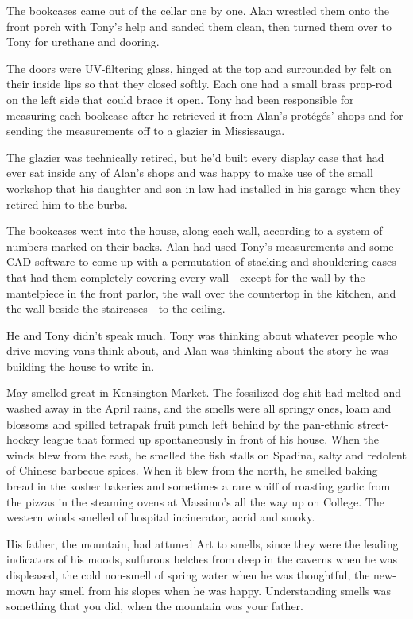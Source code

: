 \documentclass{article}
\begin{document}
The bookcases came out of the cellar one by one.  Alan wrestled them
onto the front porch with Tony's help and sanded them clean, then
turned them over to Tony for urethane and dooring.

The doors were UV-filtering glass, hinged at the top and surrounded by
felt on their inside lips so that they closed softly.  Each one had a
small brass prop-rod on the left side that could brace it open.  Tony
had been responsible for measuring each bookcase after he retrieved it
from Alan's prot\'{e}g\'{e}s' shops and for sending the measurements off
to a glazier in Mississauga.

The glazier was technically retired, but he'd built every display case
that had ever sat inside any of Alan's shops and was happy to make use
of the small workshop that his daughter and son-in-law had installed
in his garage when they retired him to the burbs.

The bookcases went into the house, along each wall, according to a
system of numbers marked on their backs.  Alan had used Tony's
measurements and some CAD software to come up with a permutation of
stacking and shouldering cases that had them completely covering every
wall---except for the wall by the mantelpiece in the front parlor, the
wall over the countertop in the kitchen, and the wall beside the
staircases---to the ceiling.

He and Tony didn't speak much.  Tony was thinking about whatever
people who drive moving vans think about, and Alan was thinking about
the story he was building the house to write in.

May smelled great in Kensington Market.  The fossilized dog shit had
melted and washed away in the April rains, and the smells were all
springy ones, loam and blossoms and spilled tetrapak fruit punch left
behind by the pan-ethnic street-hockey league that formed up
spontaneously in front of his house.  When the winds blew from the
east, he smelled the fish stalls on Spadina, salty and redolent of
Chinese barbecue spices.  When it blew from the north, he smelled
baking bread in the kosher bakeries and sometimes a rare whiff of
roasting garlic from the pizzas in the steaming ovens at Massimo's all
the way up on College.  The western winds smelled of hospital
incinerator, acrid and smoky.

His father, the mountain, had attuned Art to smells, since they were
the leading indicators of his moods, sulfurous belches from deep in
the caverns when he was displeased, the cold non-smell of spring water
when he was thoughtful, the new-mown hay smell from his slopes when he
was happy.  Understanding smells was something that you did, when the
mountain was your father.
\end{document}
